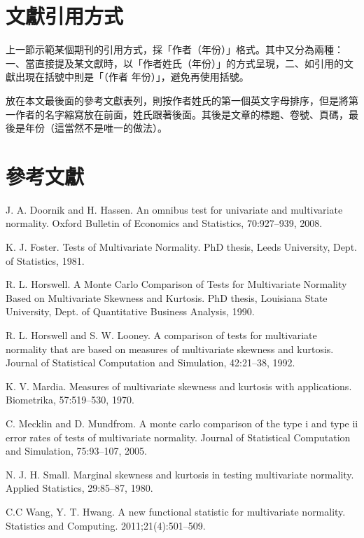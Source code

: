 \section{文獻引用方式}
上一節示範某個期刊的引用方式，採「作者（年份）」格式。其中又分為兩種：一、當直接提及某文獻時，以「作者姓氏（年份）」的方式呈現，二、如引用的文獻出現在括號中則是「（作者 年份）」，避免再使用括號。

放在本文最後面的參考文獻表列，則按作者姓氏的第一個英文字母排序，但是將第一作者的名字縮寫放在前面，姓氏跟著後面。其後是文章的標題、卷號、頁碼，最後是年份（這當然不是唯一的做法）。

\section*{參考文獻}

\begin{description}
\item J. A. Doornik and H. Hassen. An omnibus test for univariate and multivariate normality.
Oxford Bulletin of Economics and Statistics, 70:927–939, 2008.
\item K. J. Foster. Tests of Multivariate Normality. PhD thesis, Leeds University, Dept.
of Statistics, 1981.
\item R. L. Horswell. A Monte Carlo Comparison of Tests for Multivariate Normality
Based on Multivariate Skewness and Kurtosis. PhD thesis, Louisiana State University,
Dept. of Quantitative Business Analysis, 1990.
\item R. L. Horswell and S. W. Looney. A comparison of tests for multivariate normality
that are based on measures of multivariate skewness and kurtosis. Journal of
Statistical Computation and Simulation, 42:21–38, 1992.
\item K. V. Mardia. Measures of multivariate skewness and kurtosis with applications.
Biometrika, 57:519–530, 1970.
\item C. Mecklin and D. Mundfrom. A monte carlo comparison of the type i and type ii
error rates of tests of multivariate normality. Journal of Statistical Computation and
Simulation, 75:93–107, 2005.
\item N. J. H. Small. Marginal skewness and kurtosis in testing multivariate normality.
Applied Statistics, 29:85–87, 1980.
\item C.C Wang, Y. T. Hwang. A new functional statistic for multivariate normality. Statistics
and Computing. 2011;21(4):501–509.
\end{description}


